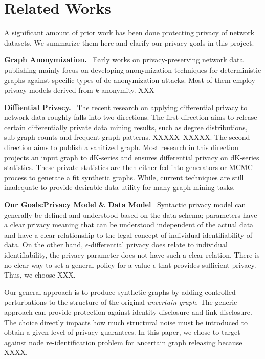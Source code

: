 \section{Related Works}
A significant amount of prior work has been done protecting privacy of network datasets.
We summarize them here and clarify our privacy goals in this project. 

\textbf{Graph Anonymization.}~ Early works on privacy-preserving network data publishing mainly focus on developing anonymization techniques for deterministic graphs against specific types of de-anonymization attacks. Most of them employ privacy models derived from $k$-anonymity. XXX 


\textbf{Diffiential Privacy.}~ The recent research on applying differential privacy to network data roughly falls into two directions. The first direction aims to release certain differentially private data mining results, such as degree distributions, sub-graph counts and frequent graph patterns. XXXXX--XXXXX. 
The second direction aims to publish a sanitized graph. Most research in this direction projects an input graph to dK-series and ensures differential privacy on dK-series statistics. These private statistics are then either fed into generators or MCMC process to generate a fit synthetic graphs. While, current techniques are still inadequate to provide desirable data utility for many graph mining tasks. 



\textbf{Our Goals:Privacy Model \& Data Model}~
Syntactic privacy model can generally be defined and understood based on the data schema; parameters have a clear privacy meaning that can be understood independent of the actual data and have a clear relationship to the legal concept of individual identifiability of data. On the other hand, $\epsilon$-differential privacy does relate to individual identifiability, the privacy parameter does not have such a clear relation. There is no clear way to set a general policy for a value $\epsilon$ that provides sufficient privacy. Thus, we choose XXX. 

Our general approach is to produce synthetic graphs by adding controlled perturbations to the structure of the original \emph{uncertain graph}. The generic approach can provide protection against identity disclosure and link disclosure. The choice directly impacts how much structural noise must be introduced to obtain a given level of privacy guarantees. In this paper, we chose to target against node re-identification problem for {\emph uncertain graph} releasing because XXXX. 